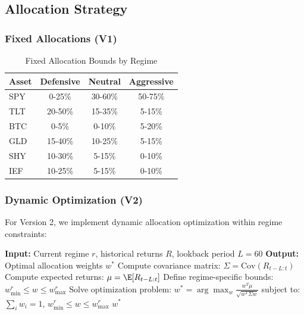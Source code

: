 \documentclass[twocolumn,ieee]{arithmaxresearch}
\begin{document}
\subsection{Allocation Strategy}

\subsubsection{Fixed Allocations (V1)}

\begin{table}[h]
\centering
\caption{Fixed Allocation Bounds by Regime}
\begin{tabular}{lccc}
\toprule
\textbf{Asset} & \textbf{Defensive} & \textbf{Neutral} & \textbf{Aggressive} \\
\midrule
SPY & 0-25\% & 30-60\% & 50-75\% \\
TLT & 20-50\% & 15-35\% & 5-15\% \\
BTC & 0-5\% & 0-10\% & 5-20\% \\
GLD & 15-40\% & 10-25\% & 5-15\% \\
SHY & 10-30\% & 5-15\% & 0-10\% \\
IEF & 10-25\% & 5-15\% & 0-10\% \\
\bottomrule
\end{tabular}
\end{table}

\subsubsection{Dynamic Optimization (V2)}

For Version 2, we implement dynamic allocation optimization within regime constraints:

\begin{algorithm}
\caption{Dynamic Allocation Optimization}
\begin{algorithmic}[1]
\STATE \textbf{Input:} Current regime $r$, historical returns $R$, lookback period $L=60$
\STATE \textbf{Output:} Optimal allocation weights $w^*$
\STATE
\STATE Compute covariance matrix: $\Sigma = \text{Cov}(R_{t-L:t})$
\STATE Compute expected returns: $\mu = \E[R_{t-L:t}]$
\STATE Define regime-specific bounds: $w_{\min}^r \leq w \leq w_{\max}^r$
\STATE
\STATE Solve optimization problem:
\STATE \quad $w^* = \arg\max_w \frac{w^T\mu}{\sqrt{w^T\Sigma w}}$
\STATE \quad subject to: $\sum_i w_i = 1$, $w_{\min}^r \leq w \leq w_{\max}^r$
\RETURN $w^*$
\end{algorithmic}
\end{algorithm}
\end{document}
